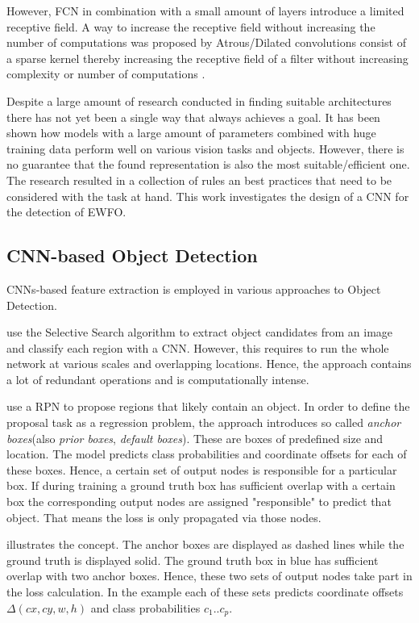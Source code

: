 However, \ac{FCN} in combination with a small amount of layers introduce a limited receptive field. A way to increase the receptive field without increasing the number of computations was proposed by Atrous/Dilated convolutions consist of a sparse kernel thereby increasing the receptive field of a filter without increasing complexity or number of computations .

Despite a large amount of research conducted in finding suitable architectures there has not yet been a single way that always achieves a goal. It has been shown how models with a large amount of parameters combined with huge training data perform well on various vision tasks and objects. However, there is no guarantee that the found representation is also the most suitable/efficient one. The research resulted in a collection of rules an best practices that need to be considered with the task at hand. This work investigates the design of a \ac{CNN} for the detection of \ac{EWFO}.

\subsection{\ac{CNN}-based Object Detection}

\acp{CNN}-based feature extraction is employed in various approaches to Object Detection. 	

\citeauthor{Girshick2013} \cite{Girshick2013} use the Selective Search algorithm \cite{Uijlings2013} to extract object candidates from an image and classify each region with a \ac{CNN}. However, this requires to run the whole network at various scales and overlapping locations. Hence, the approach contains a lot of redundant operations and is computationally intense.

\citeauthor{Ren} \cite{Ren} use a \ac{RPN} to propose regions that likely contain an object. In order to define the proposal task as a regression problem, the approach introduces so called \textit{anchor boxes}(also \textit{prior boxes}, \textit{default boxes}). These are boxes of predefined size and location. The model predicts class probabilities and coordinate offsets for each of these boxes. Hence, a certain set of output nodes is responsible for a particular box. If during training a ground truth box has sufficient overlap with a certain box the corresponding output nodes are assigned "responsible" to predict that object. That means the loss is only propagated via those nodes. 

 illustrates the concept. The anchor boxes are displayed as dashed lines while the ground truth is displayed solid. The ground truth box in blue has sufficient overlap with two anchor boxes. Hence, these two sets of output nodes take part in the loss calculation. In the example each of these sets predicts coordinate offsets $\Delta(cx, cy, w,h)$ and class probabilities $c_1 .. c_p$.

